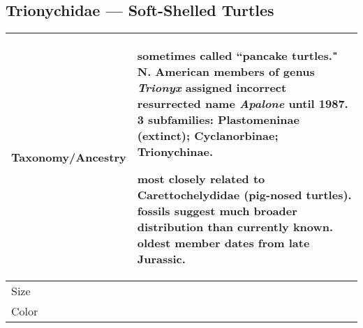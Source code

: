 \subsection{Trionychidae --- Soft-Shelled Turtles}
\begin{center}
\begin{longtabu} to 

	\hline
	Taxonomy/Ancestry &
	sometimes called ``pancake turtles." N. American members of genus \emph{Trionyx} assigned incorrect resurrected name \emph{Apalone} until 1987. 3 subfamilies: Plastomeninae (extinct); Cyclanorbinae; Trionychinae.
	
	most closely related to Carettochelydidae (pig-nosed turtles). fossils suggest much broader distribution than currently known. oldest member dates from late Jurassic.
	
	 \\
	\hline
	Size & 
	
	\\
	\hline
	Color &
	

\end{longtabu}
\end{center}
